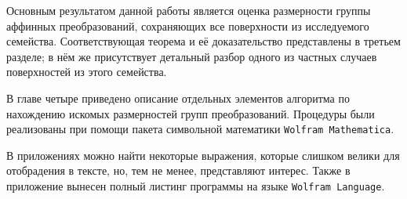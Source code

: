 \documentclass[../main.tex]{subfiles}
\begin{document}
Основным результатом данной работы является оценка размерности группы аффинных преобразований, сохраняющих все поверхности из исследуемого семейства. Соответствующая теорема и её доказательство представлены в третьем разделе; в нём же присутствует детальный разбор одного из частных случаев поверхностей из этого семейства.

В главе четыре приведено описание отдельных элементов алгоритма по нахождению искомых размерностей групп преобразований. Процедуры были реализованы при помощи пакета символьной математики \verb|Wolfram Mathematica|.

В приложениях можно найти некоторые выражения, которые слишком велики для отобрадения в тексте, но, тем не менее, представляют интерес. Также в приложение вынесен полный листинг программы на языке \verb|Wolfram Language|.
\end{document}
